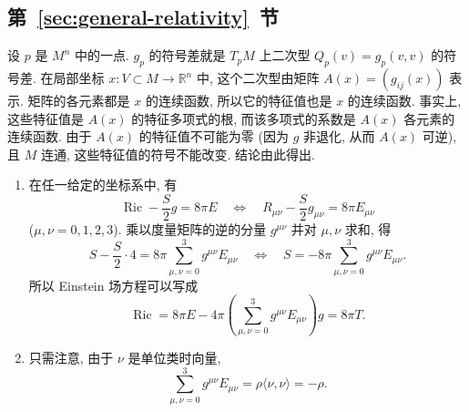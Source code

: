 \subsection{\texorpdfstring{第~\ref{sec:general-relativity}~节}{广义相对论}}\label{subsec:solutions-general-relativity}

\begin{description}[font=\normalfont,leftmargin=2em,labelwidth=1.5em]
设 $p$ 是 $M^n$ 中的一点. $g_p$ 的符号差就是 $T_pM$ 上二次型 $Q_p(v)=g_p(v,v)$ 的符号差. 在局部坐标 $x:V\subset M\to\mathbb{R}^n$ 中, 这个二次型由矩阵 $A(x)=(g_{ij}(x))$ 表示. 矩阵的各元素都是 $x$ 的连续函数, 所以它的特征值也是 $x$ 的连续函数. 事实上, 这些特征值是 $A(x)$ 的特征多项式的根, 而该多项式的系数是 $A(x)$ 各元素的连续函数. 由于 $A(x)$ 的特征值不可能为零 (因为 $g$ 非退化, 从而 $A(x)$ 可逆), 且 $M$ 连通, 这些特征值的符号不能改变. 结论由此得出.

\begin{enumerate}[label=(\alph*),ref=\alph*,leftmargin=*]
\item 在任一给定的坐标系中, 有
\[
  \operatorname{Ric}-\frac{S}{2}g=8\pi E
  \quad\Longleftrightarrow\quad R_{\mu\nu}-\frac{S}{2}g_{\mu\nu}=8\pi E_{\mu\nu}
\]
($\mu,\nu=0,1,2,3$). 乘以度量矩阵的逆的分量 $g^{\mu\nu}$ 并对 $\mu,\nu$ 求和, 得
\[
  S-\frac{S}{2}\cdot 4=8\pi\sum_{\mu,\nu=0}^3g^{\mu\nu}E_{\mu\nu}
  \quad\Longleftrightarrow\quad S=-8\pi\sum_{\mu,\nu=0}^3g^{\mu\nu}E_{\mu\nu}.
\]
所以 Einstein 场方程可以写成
\[
  \operatorname{Ric}=8\pi E-4\pi\left(\sum_{\mu,\nu=0}^3g^{\mu\nu}E_{\mu\nu}\right)g=8\pi T.
\]
\item 只需注意, 由于 $\nu$ 是单位类时向量,
\[
  \sum_{\mu,\nu=0}^3 g^{\mu\nu}E_{\mu\nu}=\rho\langle\nu,\nu\rangle=-\rho.
\]
\end{enumerate}


\end{description}
